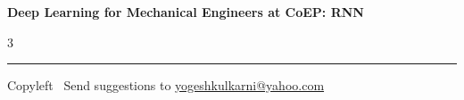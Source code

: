 \documentclass[8pt,landscape]{article}
\begin{document}
\footnotesize

\begin{center}
\Large{\textbf{Deep Learning for Mechanical Engineers at CoEP: RNN}}
\end{center}

\begin{multicols}{3}

\end{multicols}

\rule{\linewidth}{0.25pt}
\scriptsize
Copyleft \textcopyleft\  Send suggestions to
\href{http://www.yogeshkulkarni.com}{yogeshkulkarni@yahoo.com}
\end{document}
